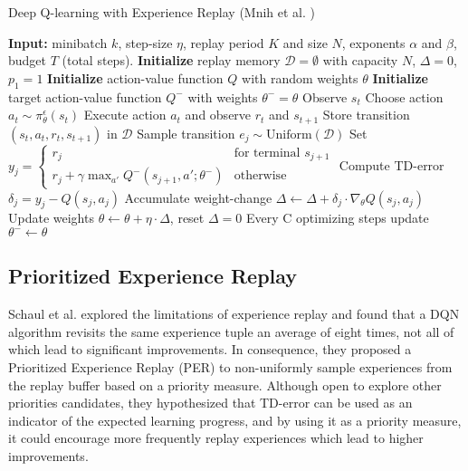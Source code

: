 \begin{algorithm}
\caption{Deep Q-learning with Experience Replay (Mnih et al. \cite{mnih2013playing, mnih2015human})}
\begin{algorithmic}[1]
\State \textbf{Input:} minibatch $k$, step-size $\eta$, replay period $K$ and size $N$, exponents $\alpha$ and $\beta$, budget $T$ (total steps).
\State \textbf{Initialize} replay memory $\mathcal{D} = \emptyset$ with capacity $N$, $\Delta = 0$, $p_1 = 1$
\State \textbf{Initialize} action-value function $Q$ with random weights $\theta$
\State \textbf{Initialize} target action-value function $Q^-$ with weights $\theta^- = \theta$
    \State Observe $s_t$
    \State Choose action $a_t \sim \pi^\epsilon_\theta(s_t)$
    \State Execute action $a_t$ and observe $r_t$ and $s_{t+1}$
    \State Store transition $(s_t, a_t, r_t, s_{t+1})$ in $\mathcal{D}$
            \State Sample transition $e_j \sim \text{Uniform}(\mathcal{D})$
            \State Set $y_j = 
            \begin{cases} 
                r_j & \text{for terminal } s_{j+1}\\
                r_j + \gamma \max_{a'} Q^-(s_{j+1}, a'; \theta^-) & \text{otherwise}
            \end{cases}$
            \State Compute TD-error $\delta_j = y_j - Q(s_j, a_j)$
            \State Accumulate weight-change $\Delta \leftarrow \Delta + \delta_j \cdot \nabla_\theta Q(s_j, a_j)$
        \EndFor
        \State Update weights $\theta \leftarrow \theta + \eta \cdot \Delta$, reset $\Delta = 0$
        \State Every C optimizing steps update $\theta^- \leftarrow \theta$
    \EndIf
\EndFor
\end{algorithmic}
\end{algorithm}


\subsection{Prioritized Experience Replay}

Schaul et al. \cite{schaul2015prioritized} explored the limitations of experience replay and found that a DQN algorithm revisits the same experience tuple an average of eight times, not all of which lead to significant improvements. In consequence, they proposed a Prioritized Experience Replay (PER) to non-uniformly sample experiences from the replay buffer based on a priority measure. Although open to explore other priorities candidates, they hypothesized that TD-error can be used as an indicator of the expected learning progress, and by using it as a priority measure, it could encourage more frequently replay experiences which lead to higher improvements.

